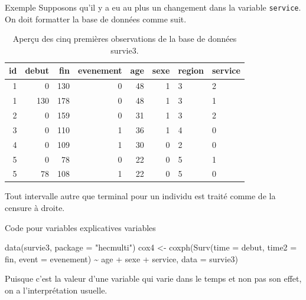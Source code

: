 \documentclass[
  ignorenonframetext,
]{beamer}
\newenvironment{Shaded}{\begin{snugshade}}{\end{snugshade}}
\newcommand{\AttributeTok}[1]{\textcolor[rgb]{0.40,0.45,0.13}{#1}}
\newcommand{\FunctionTok}[1]{\textcolor[rgb]{0.28,0.35,0.67}{#1}}
\newcommand{\NormalTok}[1]{\textcolor[rgb]{0.00,0.23,0.31}{#1}}
\newcommand{\OtherTok}[1]{\textcolor[rgb]{0.00,0.23,0.31}{#1}}
\newcommand{\SpecialCharTok}[1]{\textcolor[rgb]{0.37,0.37,0.37}{#1}}
\newcommand{\StringTok}[1]{\textcolor[rgb]{0.13,0.47,0.30}{#1}}
\begin{document}
\begin{frame}[fragile]{Exemple}
\protect\hypertarget{exemple}{}
Supposons qu'il y a eu au plus un changement dans la variable
\texttt{service}. On doit formatter la base de données comme suit.

\footnotesize

\hypertarget{tbl-survie3-donnees}{}
\begin{table}
\caption{\label{tbl-survie3-donnees}Aperçu des cinq premières observations de la base de données survie3. }\tabularnewline

\centering
\begin{tabular}{rrrrrrll}
\toprule
id & debut & fin & evenement & age & sexe & region & service\\
\midrule
1 & 0 & 130 & 0 & 48 & 1 & 3 & 2\\
1 & 130 & 178 & 0 & 48 & 1 & 3 & 1\\
2 & 0 & 159 & 0 & 31 & 1 & 3 & 2\\
3 & 0 & 110 & 1 & 36 & 1 & 4 & 0\\
4 & 0 & 109 & 1 & 30 & 0 & 2 & 0\\
5 & 0 & 78 & 0 & 22 & 0 & 5 & 1\\
5 & 78 & 108 & 1 & 22 & 0 & 5 & 0\\
\bottomrule
\end{tabular}
\end{table}

Tout intervalle autre que terminal pour un individu est traité comme de
la censure à droite.

\normalsize
\end{frame}

\begin{frame}[fragile]{Code pour variables explicatives variables}
\protect\hypertarget{code-pour-variables-explicatives-variables}{}
\begin{Shaded}
\begin{Highlighting}[numbers=left,,]
\FunctionTok{data}\NormalTok{(survie3, }\AttributeTok{package =} \StringTok{"hecmulti"}\NormalTok{)}
\NormalTok{cox4 }\OtherTok{\textless{}{-}} \FunctionTok{coxph}\NormalTok{(}\FunctionTok{Surv}\NormalTok{(}\AttributeTok{time =}\NormalTok{ debut, }
                   \AttributeTok{time2 =}\NormalTok{ fin, }
                   \AttributeTok{event =}\NormalTok{ evenement) }\SpecialCharTok{\textasciitilde{}} 
\NormalTok{                age }\SpecialCharTok{+}\NormalTok{ sexe }\SpecialCharTok{+}\NormalTok{ service, }
              \AttributeTok{data =}\NormalTok{ survie3)}
\end{Highlighting}
\end{Shaded}

\footnotesize

Puisque c'est la valeur d'une variable qui varie dans le temps et non
pas son effet, on a l'interprétation usuelle.

\normalsize
\end{frame}
\end{document}
